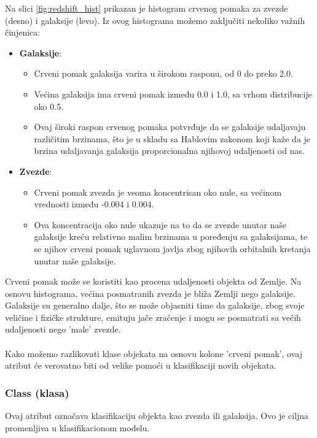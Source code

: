 \documentclass[a4paper,12pt]{article}
\begin{document}
Na slici \ref{fig:redshift_hist} prikazan je histogram crvenog pomaka za zvezde (desno) i galaksije (levo). Iz ovog histograma možemo zaključiti nekoliko važnih činjenica:

\begin{itemize}
    \item \textbf{Galaksije}: 
    \begin{itemize}
        \item Crveni pomak galaksija varira u širokom rasponu, od 0 do preko 2.0.
        \item Većina galaksija ima crveni pomak između 0.0 i 1.0, sa vrhom distribucije oko 0.5.
        \item Ovaj široki raspon crvenog pomaka potvrđuje da se galaksije udaljavaju različitim brzinama, što je u skladu sa Hablovim zakonom koji kaže da je brzina udaljavanja galaksija proporcionalna njihovoj udaljenosti od nas.
    \end{itemize}
    \item \textbf{Zvezde}: 
    \begin{itemize}
        \item Crveni pomak zvezda je veoma koncentrisan oko nule, sa većinom vrednosti između -0.004 i 0.004.
        \item Ova koncentracija oko nule ukazuje na to da se zvezde unutar naše galaksije kreću relativno malim brzinama u poređenju sa galaksijama, te se njihov crveni pomak uglavnom javlja zbog njihovih orbitalnih kretanja unutar naše galaksije.
    \end{itemize}
\end{itemize}
Crveni pomak može se koristiti kao procena udaljenosti objekta od Zemlje. Na osnovu histograma, većina posmatranih zvezda je bliža Zemlji nego galaksije. Galaksije su generalno dalje, što se može objasniti time da galaksije, zbog svoje veličine i fizičke strukture, emituju jače zračenje i mogu se posmatrati sa većih udaljenosti nego 'male' zvezde.
\\\\Kako možemo razlikovati klase objekata na osnovu kolone 'crveni pomak', ovaj atribut će verovatno biti od velike pomoći u klasifikaciji novih objekata.

\subsubsection{Class (klasa)}
Ovaj atribut označava klasifikaciju objekta kao zvezda ili galaksija. Ovo je ciljna promenljiva u klasifikacionom modelu.
\end{document}
